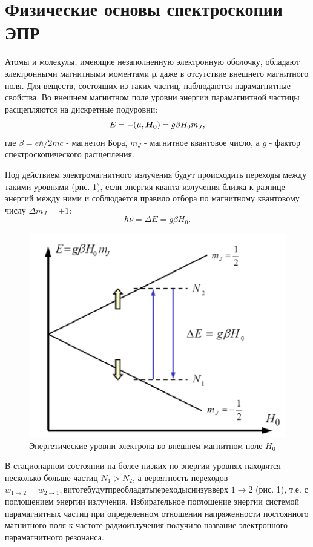 \documentclass[a4paper,14pt]{article}
\begin{document}
\section{Физические основы спектроскопии ЭПР}
Атомы и молекулы, имеющие незаполненную электронную оболочку, обладают электронными магнитными моментами $ \mathbf{\mu} $ даже в отсутствие внешнего магнитного поля. Для веществ, состоящих из таких частиц, наблюдаются парамагнитные свойства. Во внешнем магнитном поле уровни энергии парамагнитной частицы расщепляются на дискретные подуровни:
\begin{equation}
	E=-(\mathbf{\mu}, \mbox{\boldmath$H_0$})=g \beta H_0 m_J,
\end{equation}
где $ \beta = e\hbar/2mc $ - магнетон Бора, $ m_J $ - магнитное квантовое число, а $ g $ - фактор спектроскопического расщепления.
\par 
Под действием электромагнитного излучения будут происходить переходы между такими уровнями (рис. 1), если энергия кванта излучения близка к разнице энергий между ними и соблюдается правило отбора по магнитному квантовому числу $ \Delta m_J = \pm 1 $:
\begin{equation}
	h \nu = \Delta E = g \beta H_0.
\end{equation}
\begin{figure}[h]
	\centering
	\includegraphics{рис1}
	\caption{Энергетические уровни электрона во внешнем магнитном поле $ H_0 $}
	\label{fig:1}
\end{figure}
\par 
В стационарном состоянии на более низких по энергии уровнях находятся несколько больше частиц  $ N_1 > N_2 $, а вероятность переходов $ w_{1\rightarrow2}=w_{2\rightarrow1}, в итоге будут преобладать переходы снизу вверх $  $ 1\rightarrow2 $	(рис. 1), т.е. с поглощением энергии излучения. Избирательное поглощение энергии системой парамагнитных частиц при определенном отношении напряженности постоянного магнитного поля к частоте радиоизлучения получило название электронного парамагнитного резонанса.
\end{document}
